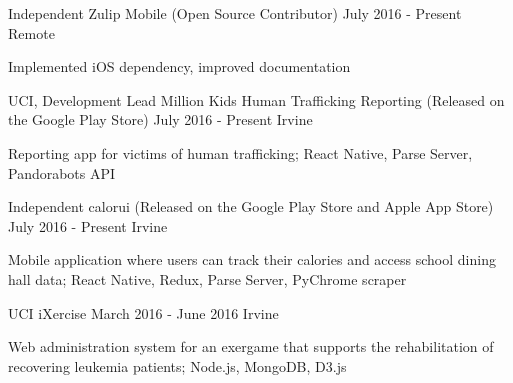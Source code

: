 

\begin{cventries}
	
	\cventry
		{Independent} %
		{Zulip Mobile (Open Source Contributor)}
		{July 2016 - Present} %
		{Remote} %
		{
			\begin{cvitems} %
				\item Implemented iOS dependency, improved documentation
			\end{cvitems}
		}
	
  \cventry
	  {UCI, Development Lead} %
	  {Million Kids Human Trafficking Reporting (Released on the Google Play Store)}
	  {July 2016 - Present} %
	  {Irvine} %
	  {
	  	\begin{cvitems} %
	  		\item Reporting app for victims of human trafficking; React Native, Parse Server, Pandorabots API
	  	\end{cvitems}
	  }

  \cventry
    {Independent} %
    {calorui (Released on the Google Play Store and Apple App Store)}
    {July 2016 - Present} %
    {Irvine} %
    {
      \begin{cvitems} %
        \item Mobile application where users can track their calories and access school dining hall data; React Native, Redux, Parse Server, PyChrome scraper
      \end{cvitems}
    }

  \cventry
    {UCI}
    {iXercise} %
    {March 2016 - June 2016} 
    {Irvine} 
    {
      \begin{cvitems} %
        \item Web administration system for an exergame that supports the rehabilitation of recovering leukemia patients; Node.js, MongoDB, D3.js
      \end{cvitems}
    }

\end{cventries}
